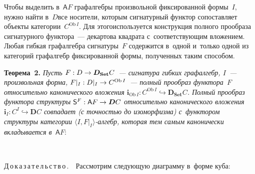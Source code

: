 \begin{multicols}{2}
\smallskip
     
     Чтобы выделить в~$\mathsf {A}F$ графалгебры произвольной 
фиксированной формы~$I$, нужно найти в~$D$\linebreak все носители, которым 
сигнатурный функ\-тор сопоставляет объекты категории~$C^{\mathrm{Ob}\,I}$. Для 
этого\linebreak используется конструкция полного прообраза сигнатурного функтора~--- 
декартова квад\-ра\-та с~со\-от\-вет\-ст\-ву\-ющим вложением. Любая гибкая граф\-ал\-геб\-ра 
сигнатуры~$F$ содержится в~одной и~только одной из категорий графалгебр 
фиксированной формы, полученных таким способом.
     
     \smallskip
     
     \noindent
     \textbf{Теорема~2.} \textit{Пусть $F : D \hm\to {\bm D}_{\mathbf{Set}}C$~--- 
сигнатура гибких графалгебр, $I$~--- произвольная форма, $F\vert_I : D\vert_I 
\hm\to C^{\mathrm{Ob}\,I}$~--- полный прообраз функтора~$F$ относительно 
канонического вложения $\bm{i}_{\mathrm{Ob}\,I} : C^{\mathrm{Ob}\,I} 
\hookrightarrow {\bm D}_{\mathbf{Set}}C$. Полный прообраз функтора структуры 
$\mathsf {S}^F : \mathsf {A}F \hm\to  {\bm D}C$ относительно канонического 
вложения ${\bm i}_I : C^I \hookrightarrow  {\bm D}C$ совпадает (с точностью 
до изоморфизма) с~функтором структуры категории  
$\langle I, F\vert_I\rangle$-ал\-гебр, которая тем самым канонически 
вкладывается в}~$\mathsf {A}F$:

\vspace*{1pt}
      \begin{center}
     \mbox{%
\epsfxsize=28.307mm 
}
\end{center}

\noindent
     Д\,о\,к\,а\,з\,а\,т\,е\,л\,ь\,с\,т\,в\,о\,.\ \  Рассмотрим сле\-ду\-ющую диаграмму в~форме куба:
     
\vspace*{1pt}
      \begin{center}
     \mbox{%
\epsfxsize=38.403mm 
}
\end{center}


\end{multicols}
